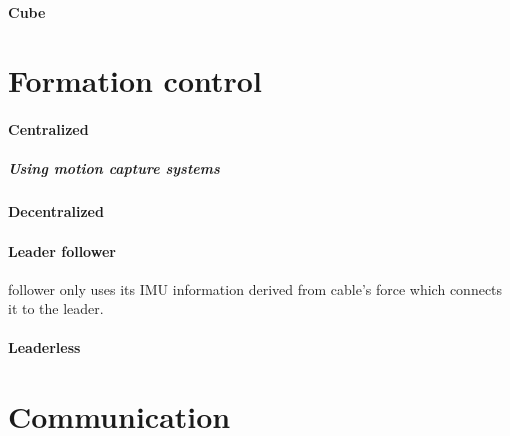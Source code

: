 \documentclass{article}
\begin{document}
		\paragraph{Cube}
			\cite{masone-2016-cooperative-transportation-of-a-payload-using-quadrotors-a-reconfigurable-cable-driven-parallel-robot}
	\section{Formation control}
		\paragraph{Centralized}
			\cite{nguyen-2015-aerial-tool-operation-system-using-quadrotors-as-rotating-thrust-generators}
			\subparagraph{Using motion capture systems}
			\paragraph{Decentralized}
			
			\paragraph{Leader follower}
			\cite{tagliabue-2017-robust-collaborative-object-transportation-using-multiple-mavs}
			\cite{tagliabue-2017-collaborative-transportation-using-mavs-via-passive-force-control}
			\cite{gassner-2017-dynamic-collaboration-without-communication-vision-based-cable-suspended-load-transport-with-two-quadrotors}
			\cite{loianno-2017-cooperative-transportation-using-small-quadrotors-using-monocular-vision-and-inertial-sensing}
			\cite{wu-2020-cooperative-transportation-of-drones-without-inter-agent-communication}
			\cite{chen-2019-cooperative-transportation-of-cable-suspended-slender-payload-using-two-quadrotors}
			\cite{xie-2020-towards-cooperative-transport-of-a-suspended-payload-via-two-aerial-robots-with-inertial-sensing} follower only uses its IMU information derived from cable's force which connects it to the leader.
		\paragraph{Leaderless}
			\cite{mohammadi-2018-decentralized-motion-control-in-a-cabled-based-multi-drone-load-transport-system,mohammadi-2020-control-of-multiple-quad-copters-with-a-cable-suspended-payload-subject-to-disturbances}
			\cite{rezaee-2017-almost-sure-attitude-consensus-in-multispacecraft-systems-with-stochastic-communication-links}
	\section{Communication}
\end{document}

